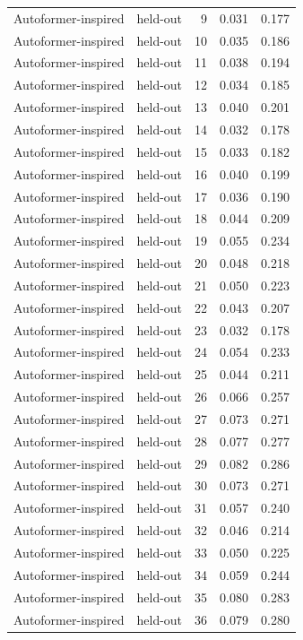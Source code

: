 \begin{tabular}{llrrr}
Autoformer-inspired & held-out & 9 & 0.031 & 0.177 \\
Autoformer-inspired & held-out & 10 & 0.035 & 0.186 \\
Autoformer-inspired & held-out & 11 & 0.038 & 0.194 \\
Autoformer-inspired & held-out & 12 & 0.034 & 0.185 \\
Autoformer-inspired & held-out & 13 & 0.040 & 0.201 \\
Autoformer-inspired & held-out & 14 & 0.032 & 0.178 \\
Autoformer-inspired & held-out & 15 & 0.033 & 0.182 \\
Autoformer-inspired & held-out & 16 & 0.040 & 0.199 \\
Autoformer-inspired & held-out & 17 & 0.036 & 0.190 \\
Autoformer-inspired & held-out & 18 & 0.044 & 0.209 \\
Autoformer-inspired & held-out & 19 & 0.055 & 0.234 \\
Autoformer-inspired & held-out & 20 & 0.048 & 0.218 \\
Autoformer-inspired & held-out & 21 & 0.050 & 0.223 \\
Autoformer-inspired & held-out & 22 & 0.043 & 0.207 \\
Autoformer-inspired & held-out & 23 & 0.032 & 0.178 \\
Autoformer-inspired & held-out & 24 & 0.054 & 0.233 \\
Autoformer-inspired & held-out & 25 & 0.044 & 0.211 \\
Autoformer-inspired & held-out & 26 & 0.066 & 0.257 \\
Autoformer-inspired & held-out & 27 & 0.073 & 0.271 \\
Autoformer-inspired & held-out & 28 & 0.077 & 0.277 \\
Autoformer-inspired & held-out & 29 & 0.082 & 0.286 \\
Autoformer-inspired & held-out & 30 & 0.073 & 0.271 \\
Autoformer-inspired & held-out & 31 & 0.057 & 0.240 \\
Autoformer-inspired & held-out & 32 & 0.046 & 0.214 \\
Autoformer-inspired & held-out & 33 & 0.050 & 0.225 \\
Autoformer-inspired & held-out & 34 & 0.059 & 0.244 \\
Autoformer-inspired & held-out & 35 & 0.080 & 0.283 \\
Autoformer-inspired & held-out & 36 & 0.079 & 0.280 \\

\end{tabular}
